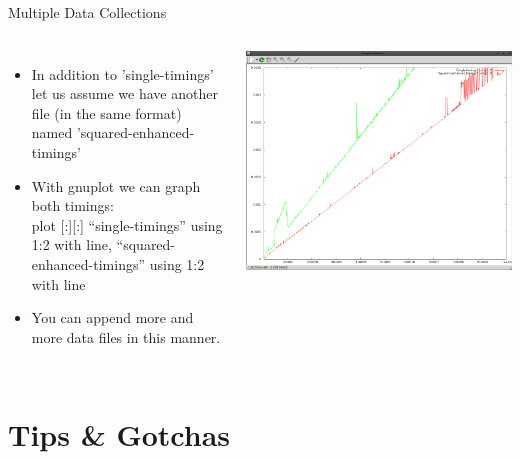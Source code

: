 \documentclass{beamer}
\begin{document}
\begin{frame}{Multiple Data Collections}
\begin{columns}
\begin{itemize}
\item In addition to 'single-timings' let us assume we have another file (in the same format) named 'squared-enhanced-timings'
\item With gnuplot we can graph both timings: \\
plot [:][:] ``single-timings'' using 1:2 with line, ``squared-enhanced-timings'' using 1:2 with line
\item {\tiny You can append more and more data files in this manner.}
\end{itemize}
\includegraphics[width=1.0\textwidth]{../imgs/timings2.png}
\end{columns}
\end{frame}

\section{Tips \& Gotchas}
\subsection{}
\end{document}
